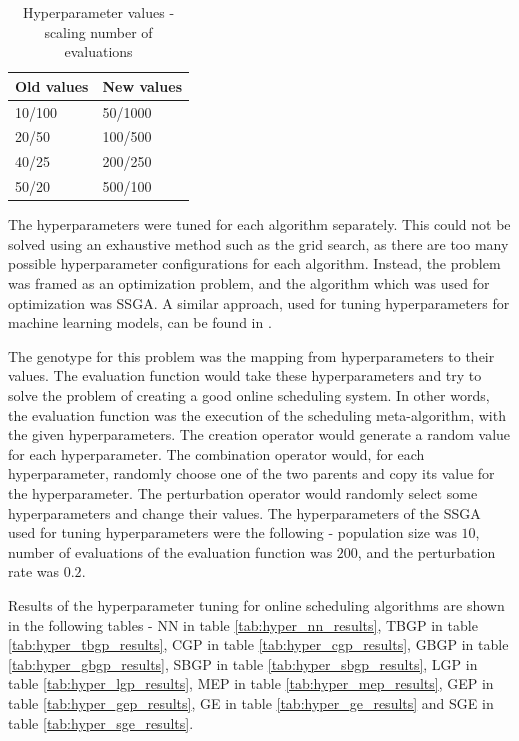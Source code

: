 \begin{table}[!htbp]
    \begin{center}
        \begin{tabular}{|l|l|} 
         \hline
            Old values & New values \\ [0.5ex] \hline\hline
            10/100 & 50/1000 \\
            \hline
            20/50 & 100/500 \\
            \hline
            40/25 & 200/250 \\
            \hline
            50/20 & 500/100 \\
            \hline
        \end{tabular}
    \end{center}
    \caption{Hyperparameter values - scaling number of evaluations}
\label{tab:hyper_scale_evaluations}
\end{table}

The hyperparameters were tuned for each algorithm separately. This could not be solved using an exhaustive method such as the grid search, as there are too many possible hyperparameter configurations for each algorithm. Instead, the problem was framed as an optimization problem, and the algorithm which was used for optimization was SSGA. A similar approach, used for tuning hyperparameters for machine learning models, can be found in \citep{hyperopti}.

The genotype for this problem was the mapping from hyperparameters to their values. The evaluation function would take these hyperparameters and try to solve the problem of creating a good online scheduling system. In other words, the evaluation function was the execution of the scheduling meta-algorithm, with the given hyperparameters. The creation operator would generate a random value for each hyperparameter. The combination operator would, for each hyperparameter, randomly choose one of the two parents and copy its value for the hyperparameter. The perturbation operator would randomly select some hyperparameters and change their values. The hyperparameters of the SSGA used for tuning hyperparameters were the following - population size was $10$, number of evaluations of the evaluation function was $200$, and the perturbation rate was $0.2$.

Results of the hyperparameter tuning for online scheduling algorithms are shown in the following tables - NN in table \ref{tab:hyper_nn_results}, 
TBGP in table \ref{tab:hyper_tbgp_results}, CGP in table \ref{tab:hyper_cgp_results}, GBGP in table \ref{tab:hyper_gbgp_results}, SBGP in table \ref{tab:hyper_sbgp_results}, LGP in table \ref{tab:hyper_lgp_results}, MEP in table \ref{tab:hyper_mep_results}, GEP in table \ref{tab:hyper_gep_results}, GE in table \ref{tab:hyper_ge_results} and SGE in table \ref{tab:hyper_sge_results}.

